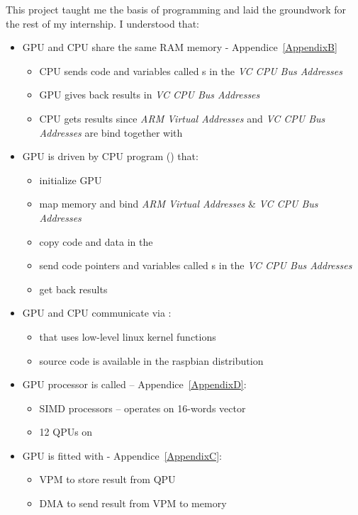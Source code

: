 This project taught me the basis of \vc{} programming and laid the groundwork for the rest of my internship. I understood that:
\begin{itemize}
	\item GPU and CPU share the same RAM memory - Appendice~\ref{AppendixB}
		\begin{itemize}
			\item CPU sends code  and variables called \uni{}s in the \emph{VC CPU Bus Addresses}
			\item GPU gives back results in \emph{VC CPU Bus Addresses}
			\item CPU gets results since \emph{ARM Virtual Addresses} and \emph{VC CPU Bus Addresses} are bind together with 
		\end{itemize}
	\item GPU is driven by CPU program () that:
		\begin{itemize}
			\item initialize GPU
			\item map \ram{} memory and bind \emph{ARM Virtual Addresses} \& \emph{VC CPU Bus Addresses}
			\item copy code and data in the \ram
			\item send code pointers and variables called \uni{}s in the \emph{VC CPU Bus Addresses}
			\item get back results
		\end{itemize}
	\item GPU and CPU communicate via \mail{}:
		\begin{itemize}
			\item \api{} that uses low-level linux kernel functions
			\item source code is available in the raspbian distribution
		\end{itemize}
	\item GPU processor is called \qpu{} -- Appendice~\ref{AppendixD}:
		\begin{itemize}
			\item SIMD processors -- operates on 16-words vector
			\item 12 QPUs on \vc
		\end{itemize}
	\item GPU is fitted with - Appendice~\ref{AppendixC}:
		\begin{itemize}
			\item VPM to store result from QPU
			\item DMA to send result from VPM to \ram{} memory

\end{itemize}
\end{itemize}
